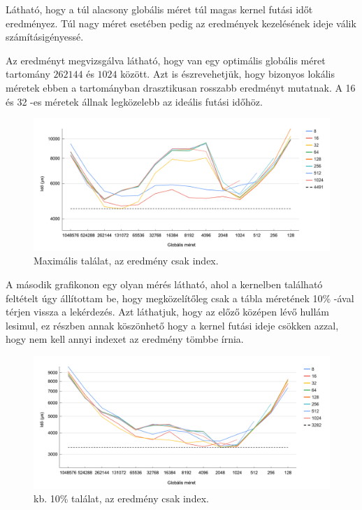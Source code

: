 Látható, hogy a túl alacsony globális méret túl magas kernel futási időt eredményez. Túl nagy méret esetében pedig az eredmények kezelésének ideje válik számításigényessé.

\newpage

Az eredményt megvizsgálva látható, hogy van egy optimális globális méret tartomány $262144$ és $1024$ között.
Azt is észrevehetjük, hogy bizonyos lokális méretek ebben a tartományban drasztikusan rosszabb eredményt mutatnak.
A 16 és 32 -es méretek állnak legközelebb az ideális futási időhöz.
\begin{figure}[h!]
\centering
\includegraphics[width=\textwidth]{images/gs_1_max.png}
\caption{Maximális találat, az eredmény csak index.}
\label{fig:schema}
\end{figure}


A második grafikonon egy olyan mérés látható, ahol a kernelben található feltételt úgy állítottam be, hogy megközelítőleg csak a tábla méretének 10\% -ával térjen vissza a lekérdezés.
Azt láthatjuk, hogy az előző középen lévő hullám lesimul, ez részben annak köszönhető hogy a kernel futási ideje csökken azzal, hogy nem kell annyi indexet az eredmény tömbbe írnia.

\begin{figure}[h!]
\centering
\includegraphics[width=\textwidth]{images/gs_1_10.png}
\caption{kb. 10\% találat, az eredmény csak index.}
\label{fig:schema}
\end{figure}

